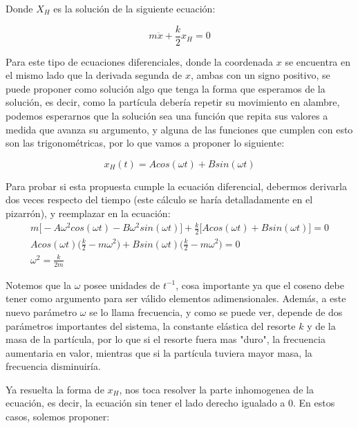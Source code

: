 \documentclass{article}
\begin{document}
Donde $X_H$ es la solución de la siguiente ecuación:

\begin{equation}
    m\ddot{x} + \frac{k}{2}x_H = 0
\end{equation}

Para este tipo de ecuaciones diferenciales, donde la coordenada $x$ se encuentra en el mismo lado que la derivada segunda de $x$, ambas con un signo positivo, se puede proponer como solución algo que tenga la forma que esperamos de la solución, es decir, como la partícula debería repetir su movimiento en alambre, podemos esperarnos que la solución sea una función que repita sus valores a medida que avanza su argumento, y alguna de las funciones que cumplen con esto son las trigonométricas, por lo que vamos a proponer lo siguiente:

\begin{equation}
    x_H(t) = Acos(\omega t) + Bsin(\omega t)
\end{equation}

Para probar si esta propuesta cumple la ecuación diferencial, debermos derivarla dos veces respecto del tiempo (este cálculo se haría detalladamente en el pizarrón), y reemplazar en la ecuación:
\begin{equation}
\begin{split}
    m\big[ -A\omega^2cos(\omega t) - B\omega^2sin(\omega t) \big] + \frac{k}{2}\big[ Acos(\omega t) + Bsin(\omega t) \big] = 0 \\
    Acos(\omega t) \bigg(\frac{k}{2} - m\omega^2\bigg) + Bsin(\omega t)\bigg( \frac{k}{2} - m\omega^2 \bigg) = 0 \\
    \omega^2 = \frac{k}{2m}
\end{split}
\end{equation}

Notemos que la $\omega$ posee unidades de $t^{-1}$, cosa importante ya que el coseno debe tener como argumento para ser válido elementos adimensionales. Además, a este nuevo parámetro $\omega$ se lo llama frecuencia, y como se puede ver, depende de dos parámetros importantes del sistema, la constante elástica del resorte $k$ y de la masa de la partícula, por lo que si el resorte fuera mas "duro", la frecuencia aumentaria en valor, mientras que si la partícula tuviera mayor masa, la frecuencia disminuiría.

Ya resuelta la forma de $x_H$, nos toca resolver la parte inhomogenea de la ecuación, es decir, la ecuación sin tener el lado derecho igualado a $0$. En estos casos, solemos proponer:
\end{document}
